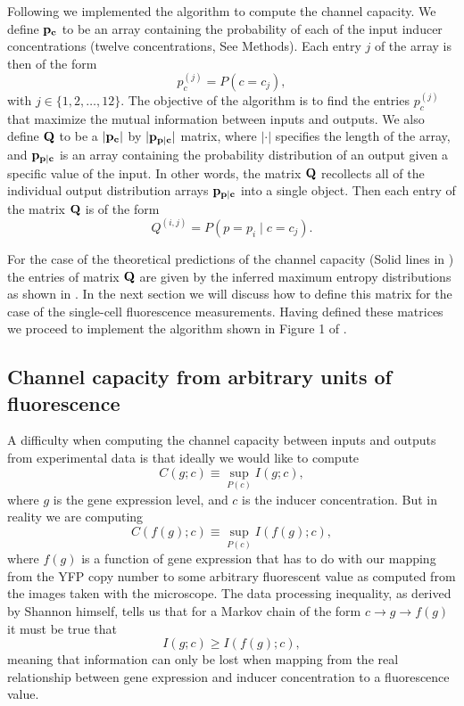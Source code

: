 Following \cite{Blahut1972} we implemented the algorithm to compute the channel
capacity. We define $\mathbf{p_c}$ to be an array containing the probability of
each of the input inducer concentrations (twelve concentrations, See Methods).
Each entry $j$ of the array is then of the form
\begin{equation}
  p_c^{(j)} = P(c = c_j),
\end{equation}
with $j \in \{1, 2, \ldots, 12 \}$. The objective of the algorithm is to find
the entries $p_c^{(j)}$ that maximize the mutual information between inputs and
outputs. We also define $\mathbf{Q}$ to be a $\vert \mathbf{p_c} \vert$ by
$\vert \mathbf{p_{p \mid c}} \vert$ matrix, where $\vert \cdot \vert$ specifies the
length of the array, and $\mathbf{p_{p \mid c}}$ is an array containing the
probability distribution of an output given a specific value of the input. In
other words, the matrix $\mathbf{Q}$ recollects all of the individual output
distribution arrays $\mathbf{p_{p \mid c}}$ into a single object. Then each entry
of the matrix $\mathbf{Q}$ is of the form
\begin{equation}
  Q^{(i, j)} = P(p = p_i \mid c = c_j).
\end{equation}

For the case of the theoretical predictions of the channel capacity (Solid
lines in ) the entries of matrix $\mathbf{Q}$ are given by the
inferred maximum entropy distributions as shown in . In the
next section we will discuss how to define this matrix for the case of the
single-cell fluorescence measurements. Having defined these matrices we proceed
to implement the algorithm shown in Figure 1 of \cite{Blahut1972}.

\subsection{Channel capacity from arbitrary units of fluorescence}

A difficulty when computing the channel capacity between inputs and outputs
from experimental data is that ideally we would like to compute
\begin{equation}
C(g; c) \equiv \sup_{P(c)} I(g; c),
\end{equation}
where $g$ is the gene expression level, and $c$ is the inducer concentration.
But in reality we are computing
\begin{equation}
C(f(g); c) \equiv \sup_{P(c)} I(f(g); c),
\end{equation}
where $f(g)$ is a function of gene expression that has to do with our mapping
from the YFP copy number to some arbitrary fluorescent value as computed from
the images taken with the microscope. The data processing inequality, as
derived by Shannon himself, tells us that for a Markov chain of the form $c
\rightarrow
g \rightarrow f(g)$ it must be true that \cite{Shannon1948}
\begin{equation}
I(g; c) \geq I(f(g); c),
\end{equation}
meaning that information can only be lost when mapping from the real
relationship between gene expression and inducer concentration to a
fluorescence value.

